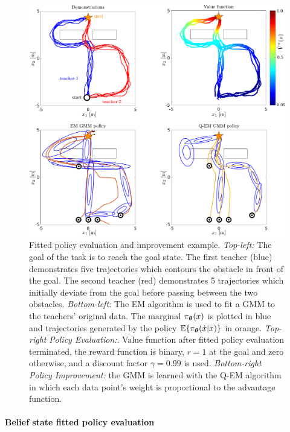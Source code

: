 \begin{figure}
 \centering
 \setlength\fboxsep{0pt}
  \setlength\fboxrule{0.25pt}
  \includegraphics[width=\textwidth]{./ch4-PiH/Figures/fpe_example.pdf}
 \caption{Fitted policy evaluation and improvement example. 
  \textit{Top-left:} The goal of the task is to reach the goal state. The first teacher (blue) demonstrates 
  five trajectories which contours the obstacle in front of the goal. The second teacher (red) demonstrates 
  5 trajectories which initially deviate from the goal before passing between the two obstacles. 
  \textit{Bottom-left:} The EM algorithm is used to fit a GMM to the teachers' original data. 
  The marginal $\pi_{\boldsymbol{\theta}}(x)$ is plotted in blue and trajectories generated by the 
  policy $\mathbb{E}\{\pi_{\boldsymbol{\theta}}(\dot{x}|x)\}$ in orange. \textit{Top-right} \textit{Policy Evaluation:}.  
  Value function after fitted policy evaluation terminated, the reward function 
  is binary, $r=1$ at the goal and zero otherwise, and a discount factor $\gamma = 0.99$ is used.
  \textit{Bottom-right} \textit{Policy Improvement:} the GMM is learned with the Q-EM algorithm in which 
  each data point's weight is proportional to the advantage function.
 }
  \label{fig:fpe_example}
\end{figure}

\paragraph{Belief state fitted policy evaluation}

